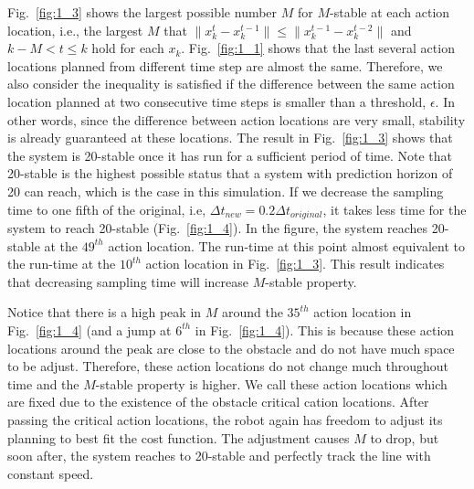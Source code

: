 \documentclass{ifacconf}
\begin{document}




Fig.~\ref{fig:1_3} shows the largest possible number $M$ for $M$-stable at each action location, i.e., the largest $M$ that  $\|x_{k}^t-x_k^{t-1}\|\leq \|x_k^{t-1}-x_k^{t-2}\|$ and $k-M< t\leq k$ hold for each $x_k$. Fig.~\ref{fig:1_1} shows that the last several action locations planned from different time step are almost the same. Therefore, we also consider the inequality is satisfied if the difference between the same action location planned at two consecutive time steps is smaller than a threshold, $\epsilon$. In other words, since the difference between action locations are very small, stability is already guaranteed at these locations. The result in Fig.~\ref{fig:1_3} shows that the system is 20-stable once it has run for a sufficient period of time. Note that 20-stable is the highest possible status that a system with prediction horizon of 20 can reach, which is the case in this simulation. If we decrease the sampling time to one fifth of the original, i.e, $\Delta t_{new}=0.2\Delta t_{original}$, it takes less time for the system to reach 20-stable (Fig.~\ref{fig:1_4}). In the figure, the system reaches 20-stable at the $49^{th}$ action location. The run-time at this point almost equivalent to the run-time at the $10^{th}$ action location in Fig.~\ref{fig:1_3}. This result indicates that decreasing sampling time will increase $M$-stable property.

Notice that there is a high peak in $M$ around the $35^{th}$ action location in Fig.~\ref{fig:1_4} (and a jump at $6^{th}$ in Fig.~\ref{fig:1_4}). This is because these action locations around the peak are close to the obstacle and do not have much space to be adjust. Therefore, these action locations do not change much throughout time and the $M$-stable property is higher. We call these action locations which are fixed due to the existence of the obstacle critical cation locations. After passing the critical action locations, the robot again has freedom to adjust its planning to best fit the cost function. The adjustment causes $M$ to drop, but soon after, the system reaches to 20-stable and perfectly track the line with constant speed. 
\end{document}
